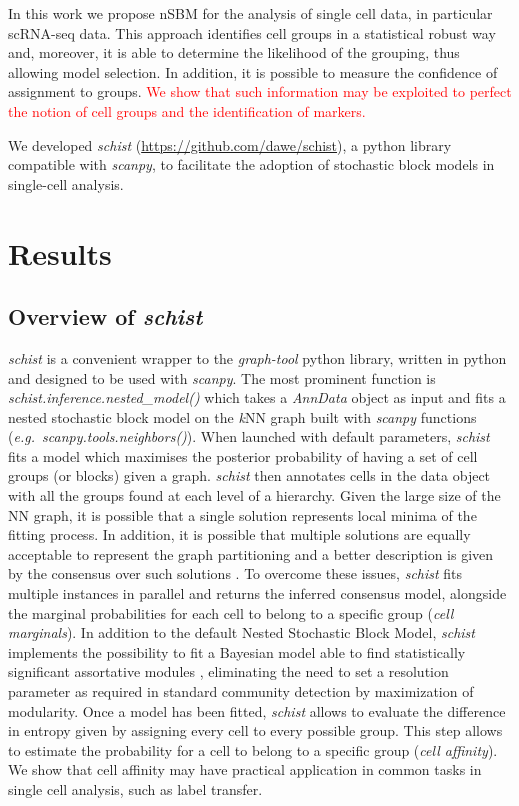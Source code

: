 \documentclass[10pt]{article}
\begin{document}
In this work we propose nSBM for the analysis of single cell data, in particular scRNA-seq data. This approach identifies cell groups in a statistical robust way and, moreover, it is able to determine the likelihood of the grouping, thus allowing model selection. In addition, it is possible to measure the confidence of assignment to groups. \textcolor{red}{We show that such information may be exploited to perfect the notion of cell groups and the identification of markers.}

We developed \emph{schist} (\href{https://github.com/dawe/schist}{https:/\slash github.com\slash dawe\slash schist}), a python library compatible with \emph{scanpy}, to facilitate the adoption of stochastic block models in single-cell analysis.

\section*{Results}

\subsection*{Overview of \emph{schist}}

\emph{schist} is a convenient wrapper to the \emph{graph-tool} python library, written in python and designed to be used with \emph{scanpy}. The most prominent function is \emph{schist.inference.nested\_model()} which takes a \emph{AnnData} object as input and fits a nested stochastic block model on the \emph{k}NN graph built with \emph{scanpy} functions (\emph{e.g.\ scanpy.tools.neighbors()}). When launched with default parameters, \emph{schist} fits a model which maximises the posterior probability of having a set of cell groups (or blocks) given a graph. \emph{schist} then annotates cells in the data object with all the groups found at each level of a hierarchy. Given the large size of the NN graph, it is possible that a single solution represents local minima of the fitting process. In addition, it is possible that multiple solutions are equally acceptable to represent the graph partitioning and a better description is given by the consensus over such solutions \cite{Peixoto_2021_consensus}. To overcome these issues, \emph{schist} fits multiple instances in parallel and returns the inferred consensus model, alongside the marginal probabilities for each cell to belong to a specific group (\emph{cell marginals}). 
In addition to the default Nested Stochastic Block Model, \emph{schist} implements the possibility to fit a Bayesian model able to find statistically significant assortative modules \cite{Zhang_Peixoto_2020}, eliminating the need to set a resolution parameter as required in standard community detection by maximization of modularity.
Once a model has been fitted, \emph{schist} allows to evaluate the difference in entropy given by assigning every cell to every possible group. This step allows to estimate the probability for a cell to belong to a specific group (\emph{cell affinity}). We show that cell affinity may have practical application in common tasks in single cell analysis, such as label transfer.
\end{document}
